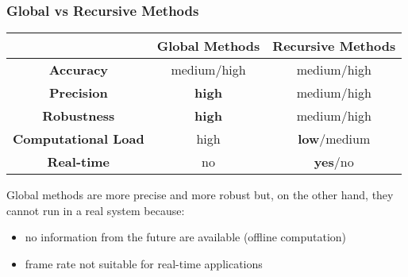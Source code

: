 \begin{frame}
	\frametitle{Global vs Recursive Methods}
	
	\begin{table}[!t]
		\centering
		\begin{tabular}{ c | c | c | }
			\cline{2-3}
			& \textbf{Global Methods} & \textbf{Recursive Methods} \\ \hline
			
			\multicolumn{1}{|c|}{\textbf{Accuracy}} & medium/high & medium/high \\ \hline
			\multicolumn{1}{|c|}{\textbf{Precision}} & \textbf{high} & medium/high \\ \hline
			\multicolumn{1}{|c|}{\textbf{Robustness}} & \textbf{high} & medium/high \\ \hline
			\multicolumn{1}{|c|}{\textbf{Computational Load}} & high & \textbf{low}/medium \\ \hline
			\multicolumn{1}{|c|}{\textbf{Real-time}} & no & \textbf{yes}/no \\ \hline
		\end{tabular}
	\end{table}
	
	\vspace{0.4cm}
	
	Global methods are more precise and more robust but, on the other hand, they
	cannot run in a real system because:
	
	\begin{itemize}
		\item no information from the future are available (offline computation)
		\item frame rate not suitable for real-time applications
	\end{itemize}
\end{frame}
